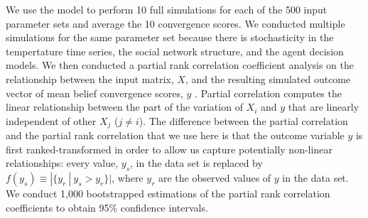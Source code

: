 \documentclass{wscpaperproc}\usepackage[]{graphicx}\usepackage[]{color}
\begin{document}
We use the model to perform 10 full simulations for each of the 500 input parameter sets and average the 10 convergence scores. We conducted multiple simulations for the same parameter set because there is stochasticity in the tempertature time series, the social network structure, and the agent decision models. We then conducted a partial rank correlation coefficient analysis on the relationship between the input matrix, $X$, and the resulting simulated outcome vector of mean belief convergence scores, $y$ . Partial correlation computes the linear relationship between the part of the variation of $X_i$ and $y$ that are linearly independent of other $X_j$  ($j \neq i$).  The difference between the partial correlation and the partial rank correlation that we use here is that the outcome variable $y$ is first ranked-transformed in order to allow us capture potentially non-linear relationships: every value, $y_s$, in the data set is replaced by $f(y_s) \equiv |\{y_r~|~ y_s > y_r\}|$, 
where $y_r$ are the observed values of $y$ in the data set. We conduct 1,000 bootstrapped estimations of the partial rank correlation coefficients to obtain 95\% confidence intervals.
\end{document}
